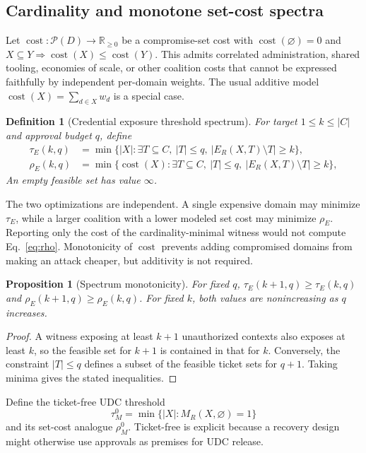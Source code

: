 \documentclass[preprint,12pt]{elsarticle}
\newtheorem{definition}{Definition}
\newtheorem{proposition}{Proposition}
\newcommand{\Cost}{\operatorname{cost}}
\newcommand{\powerset}{\mathcal{P}}
\begin{document}
\subsection{Cardinality and monotone set-cost spectra}

Let $\Cost:\powerset(D)\rightarrow\mathbb{R}_{\ge0}$ be a compromise-set cost
with $\Cost(\varnothing)=0$ and
$X\subseteq Y\Rightarrow\Cost(X)\le\Cost(Y)$.  This admits correlated
administration, shared tooling, economies of scale, or other coalition costs
that cannot be expressed faithfully by independent per-domain weights.  The
usual additive model $\Cost(X)=\sum_{d\in X}w_d$ is a special case.

\begin{definition}[Credential exposure threshold spectrum]
For target $1\le k\le |C|$ and approval budget $q$, define
\begin{align}
\tau_E(k,q)&=\min\{|X|:\exists T\subseteq C,\ |T|\le q,\
 |E_R(X,T)\setminus T|\ge k\},\label{eq:tau}\\
\rho_E(k,q)&=\min\{\Cost(X):\exists T\subseteq C,\ |T|\le q,\
 |E_R(X,T)\setminus T|\ge k\},\label{eq:rho}
\end{align}
An empty feasible set has value $\infty$.
\end{definition}

The two optimizations are independent.  A single expensive domain may minimize
$\tau_E$, while a larger coalition with a lower modeled set cost may minimize
$\rho_E$.  Reporting only the cost of the cardinality-minimal witness would not
compute Eq.~\eqref{eq:rho}.  Monotonicity of $\Cost$ prevents adding compromised
domains from making an attack cheaper, but additivity is not required.

\begin{proposition}[Spectrum monotonicity]
For fixed $q$, $\tau_E(k+1,q)\ge\tau_E(k,q)$ and
$\rho_E(k+1,q)\ge\rho_E(k,q)$.  For fixed $k$, both values are nonincreasing as
$q$ increases.
\end{proposition}

\begin{proof}
A witness exposing at least $k+1$ unauthorized contexts also exposes at least
$k$, so the feasible set for $k+1$ is contained in that for $k$.  Conversely,
the constraint $|T|\le q$ defines a subset of the feasible ticket sets for
$q+1$.  Taking minima gives the stated inequalities.
\end{proof}

Define the ticket-free UDC threshold
\[
\tau_M^{0}=\min\{|X|:M_R(X,\varnothing)=1\}
\]
and its set-cost analogue $\rho_M^{0}$.  Ticket-free is explicit because a
recovery design might otherwise use approvals as premises for UDC release.
\end{document}
